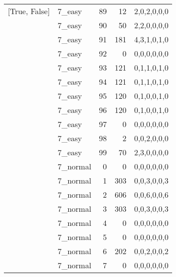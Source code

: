 \begin{tabular}{llrrl}
 [True, False]   & 7\_easy              &            89 &                    12 & 2,0,2,0,0,0   \\
 [True, False]   & 7\_easy              &            90 &                    50 & 2,2,0,0,0,0   \\
 [True, False]   & 7\_easy              &            91 &                   181 & 4,3,1,0,1,0   \\
 [True, False]   & 7\_easy              &            92 &                     0 & 0,0,0,0,0,0   \\
 [True, False]   & 7\_easy              &            93 &                   121 & 0,1,1,0,1,0   \\
 [True, False]   & 7\_easy              &            94 &                   121 & 0,1,1,0,1,0   \\
 [True, False]   & 7\_easy              &            95 &                   120 & 0,1,0,0,1,0   \\
 [True, False]   & 7\_easy              &            96 &                   120 & 0,1,0,0,1,0   \\
 [True, False]   & 7\_easy              &            97 &                     0 & 0,0,0,0,0,0   \\
 [True, False]   & 7\_easy              &            98 &                     2 & 0,0,2,0,0,0   \\
 [True, False]   & 7\_easy              &            99 &                    70 & 2,3,0,0,0,0   \\
 [True, False]   & 7\_normal            &             0 &                     0 & 0,0,0,0,0,0   \\
 [True, False]   & 7\_normal            &             1 &                   303 & 0,0,3,0,0,3   \\
 [True, False]   & 7\_normal            &             2 &                   606 & 0,0,6,0,0,6   \\
 [True, False]   & 7\_normal            &             3 &                   303 & 0,0,3,0,0,3   \\
 [True, False]   & 7\_normal            &             4 &                     0 & 0,0,0,0,0,0   \\
 [True, False]   & 7\_normal            &             5 &                     0 & 0,0,0,0,0,0   \\
 [True, False]   & 7\_normal            &             6 &                   202 & 0,0,2,0,0,2   \\
 [True, False]   & 7\_normal            &             7 &                     0 & 0,0,0,0,0,0   \\

\end{tabular}
